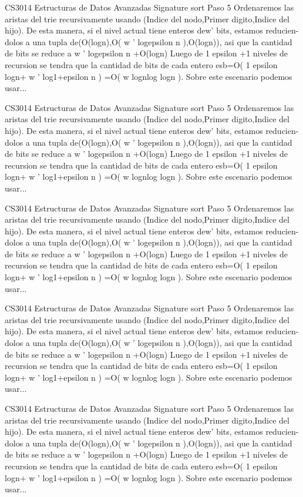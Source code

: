 \begin{description}[leftmargin=!,labelwidth=4.2em,style=nextline]
\item[Pag. 41] CS3014 Estructuras de Datos Avanzadas Signature sort Paso 5 Ordenaremos las aristas del trie recursivamente usando (Indice del nodo,Primer digito,Indice del hijo). De esta manera, si el nivel actual tiene enteros dew' bits, estamos reducien- dolos a una tupla de(O(logn),O( w ' logepsilon n ),O(logn)), asi que la cantidad de bits se reduce a w ' logepsilon n +O(logn) Luego de 1 epsilon +1 niveles de recursion se tendra que la cantidad de bits de cada entero esb=O( 1 epsilon logn+ w ' log1+epsilon n ) =O( w lognlog logn ). Sobre este escenario podemos usar...
\item[Pag. 42] CS3014 Estructuras de Datos Avanzadas Signature sort Paso 5 Ordenaremos las aristas del trie recursivamente usando (Indice del nodo,Primer digito,Indice del hijo). De esta manera, si el nivel actual tiene enteros dew' bits, estamos reducien- dolos a una tupla de(O(logn),O( w ' logepsilon n ),O(logn)), asi que la cantidad de bits se reduce a w ' logepsilon n +O(logn) Luego de 1 epsilon +1 niveles de recursion se tendra que la cantidad de bits de cada entero esb=O( 1 epsilon logn+ w ' log1+epsilon n ) =O( w lognlog logn ). Sobre este escenario podemos usar...
\item[Pag. 43] CS3014 Estructuras de Datos Avanzadas Signature sort Paso 5 Ordenaremos las aristas del trie recursivamente usando (Indice del nodo,Primer digito,Indice del hijo). De esta manera, si el nivel actual tiene enteros dew' bits, estamos reducien- dolos a una tupla de(O(logn),O( w ' logepsilon n ),O(logn)), asi que la cantidad de bits se reduce a w ' logepsilon n +O(logn) Luego de 1 epsilon +1 niveles de recursion se tendra que la cantidad de bits de cada entero esb=O( 1 epsilon logn+ w ' log1+epsilon n ) =O( w lognlog logn ). Sobre este escenario podemos usar...
\item[Pag. 44] CS3014 Estructuras de Datos Avanzadas Signature sort Paso 5 Ordenaremos las aristas del trie recursivamente usando (Indice del nodo,Primer digito,Indice del hijo). De esta manera, si el nivel actual tiene enteros dew' bits, estamos reducien- dolos a una tupla de(O(logn),O( w ' logepsilon n ),O(logn)), asi que la cantidad de bits se reduce a w ' logepsilon n +O(logn) Luego de 1 epsilon +1 niveles de recursion se tendra que la cantidad de bits de cada entero esb=O( 1 epsilon logn+ w ' log1+epsilon n ) =O( w lognlog logn ). Sobre este escenario podemos usar...
\item[Pag. 45] CS3014 Estructuras de Datos Avanzadas Signature sort Paso 5 Ordenaremos las aristas del trie recursivamente usando (Indice del nodo,Primer digito,Indice del hijo). De esta manera, si el nivel actual tiene enteros dew' bits, estamos reducien- dolos a una tupla de(O(logn),O( w ' logepsilon n ),O(logn)), asi que la cantidad de bits se reduce a w ' logepsilon n +O(logn) Luego de 1 epsilon +1 niveles de recursion se tendra que la cantidad de bits de cada entero esb=O( 1 epsilon logn+ w ' log1+epsilon n ) =O( w lognlog logn ). Sobre este escenario podemos usar...

\end{description}
